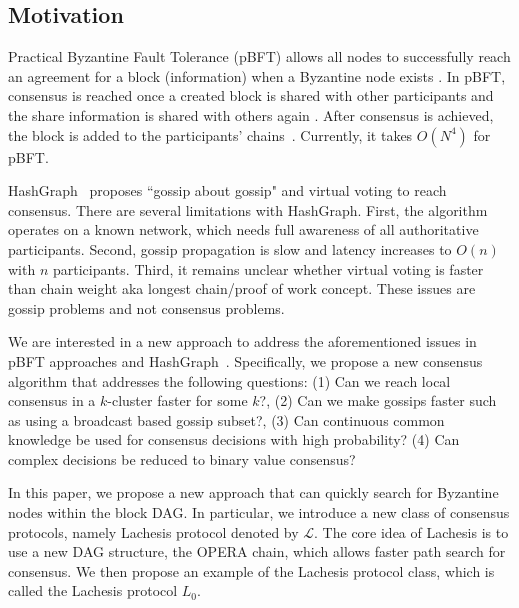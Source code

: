 \documentclass[preprint,12pt]{elsarticle}
\begin{document}
\subsection{Motivation}

Practical Byzantine Fault Tolerance (pBFT) allows all nodes to successfully reach an agreement for a block (information) when a Byzantine node exists \cite{Castro99}. In pBFT, consensus is reached once a created block is shared with other participants and the share information is shared with others again \cite{zyzzyva07, honey16}. After consensus is achieved, the block is added to the participants’ chains~\cite{Castro99, Blockmania18}.
Currently, it takes $O(N^4)$ for pBFT.

HashGraph~\cite{hashgraph16} proposes ``gossip about gossip" and virtual voting to reach consensus. There are several limitations with HashGraph.
First, the algorithm operates on a known network, which needs full awareness of all authoritative participants. Second, gossip propagation is slow and latency increases to $O(n)$ with $n$ participants. Third, it remains unclear whether virtual voting is faster than chain weight aka longest chain/proof of work concept. These issues are gossip problems and not consensus problems. 


We are interested in a new approach to address the aforementioned issues in pBFT approaches \cite{Castro99,zyzzyva07, honey16} and HashGraph~\cite{hashgraph16}. Specifically, we propose a new consensus algorithm that addresses the following questions: (1) Can we reach local consensus in a $k$-cluster faster for some $k$?, (2) Can we make gossips faster such as using a broadcast based gossip subset?, (3) Can continuous common knowledge be used for consensus decisions with high probability? (4) Can complex decisions be reduced to binary value consensus?

In this paper, we propose a new approach that can quickly search for Byzantine nodes within the block DAG.
In particular, we introduce a new class of consensus protocols, namely Lachesis protocol denoted by $\mathcal{L}$. The core idea of Lachesis is to use a new DAG structure, the OPERA chain, which allows faster path search for consensus.
We then propose an example of the Lachesis protocol class, which is called the Lachesis protocol $L_0$.
\end{document}
